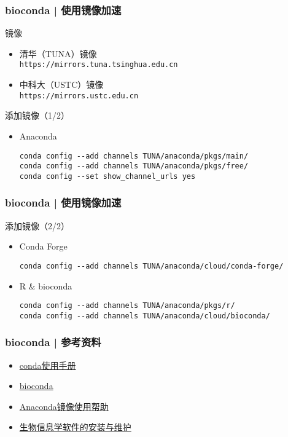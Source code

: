 \begin{frame}[fragile]
  \frametitle{bioconda | 使用镜像加速}
  \begin{block}{镜像}
    \begin{itemize}
      \item 清华（TUNA）镜像\\ \verb|https://mirrors.tuna.tsinghua.edu.cn|
      \item 中科大（USTC）镜像\\ \verb|https://mirrors.ustc.edu.cn|
    \end{itemize}
  \end{block}
  \pause
  \begin{block}{添加镜像（1/2）}
    \begin{itemize}
      \item Anaconda
\begin{lstlisting}
conda config --add channels TUNA/anaconda/pkgs/main/
conda config --add channels TUNA/anaconda/pkgs/free/
conda config --set show_channel_urls yes
\end{lstlisting}
    \end{itemize}
  \end{block}
\end{frame}

\begin{frame}[fragile]
  \frametitle{bioconda | 使用镜像加速}
  \begin{block}{添加镜像（2/2）}
    \begin{itemize}
      \item Conda Forge
\begin{lstlisting}
conda config --add channels TUNA/anaconda/cloud/conda-forge/
\end{lstlisting}
      \item R \& bioconda
\begin{lstlisting}
conda config --add channels TUNA/anaconda/pkgs/r/
conda config --add channels TUNA/anaconda/cloud/bioconda/
\end{lstlisting}
    \end{itemize}
  \end{block}
\end{frame}

\begin{frame}
  \frametitle{bioconda | 参考资料}
  \begin{itemize}
    \item \href{https://conda.io/docs/}{conda使用手册}
    \item \href{https://bioconda.github.io/}{bioconda}
    \item \href{https://mirrors.tuna.tsinghua.edu.cn/help/anaconda/}{Anaconda镜像使用帮助}
    \item \href{https://github.com/Yixf-Education/demo4bx/tree/master/conda}{生物信息学软件的安装与维护}
  \end{itemize}
\end{frame}

